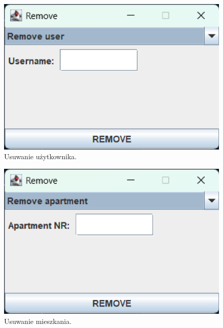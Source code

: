 \begin{figure}[H]
    \centering
    \includegraphics[width=\textwidth,height=0.15\textheight,keepaspectratio]{figures/app-images/Remove/remove-user.eps}
    \caption{Usuwanie użytkownika.\label{fig15}}
\end{figure}

\begin{figure}[H]
    \centering
    \includegraphics[width=\textwidth,height=0.15\textheight,keepaspectratio]{figures/app-images/Remove/remove-apartment.eps}
    \caption{Usuwanie mieszkania.\label{fig16}}
\end{figure}

